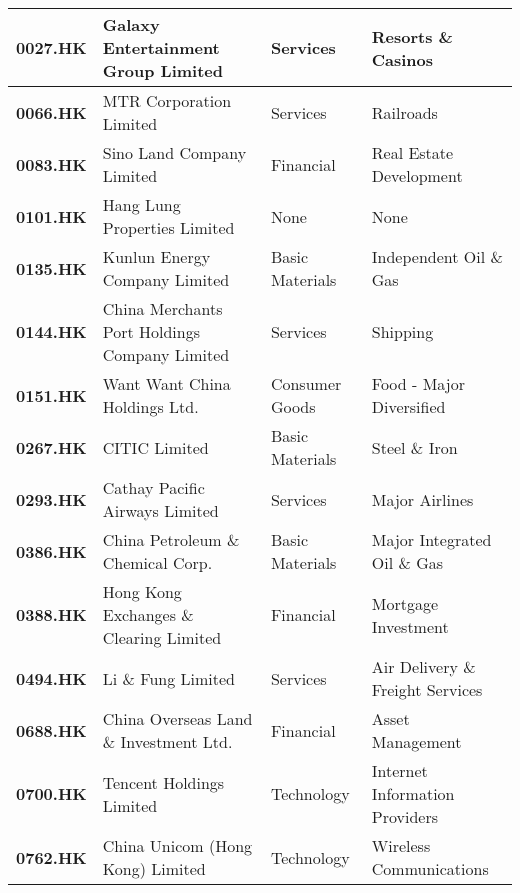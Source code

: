 \begin{table}[h]
{\begin{tabular}{|l|l|l|l|}
			\textbf{0027.HK} & Galaxy Entertainment Group Limited               & Services         & Resorts \& Casinos                        \\ \hline
			\textbf{0066.HK} & MTR Corporation Limited                          & Services         & Railroads                                 \\ \hline
			\textbf{0083.HK} & Sino Land Company Limited                        & Financial        & Real Estate Development                   \\ \hline
			\textbf{0101.HK} & Hang Lung Properties Limited                     & None             & None                                      \\ \hline
			\textbf{0135.HK} & Kunlun Energy Company Limited                    & Basic Materials  & Independent Oil \& Gas                    \\ \hline
			\textbf{0144.HK} & China Merchants Port Holdings Company Limited    & Services         & Shipping                                  \\ \hline
			\textbf{0151.HK} & Want Want China Holdings Ltd.                    & Consumer Goods   & Food - Major Diversified                  \\ \hline
			\textbf{0267.HK} & CITIC Limited                                    & Basic Materials  & Steel \& Iron                             \\ \hline
			\textbf{0293.HK} & Cathay Pacific Airways Limited                   & Services         & Major Airlines                            \\ \hline
			\textbf{0386.HK} & China Petroleum \& Chemical Corp.                & Basic Materials  & Major Integrated Oil \& Gas               \\ \hline
			\textbf{0388.HK} & Hong Kong Exchanges \& Clearing Limited          & Financial        & Mortgage Investment                       \\ \hline
			\textbf{0494.HK} & Li \& Fung Limited                               & Services         & Air Delivery \& Freight Services          \\ \hline
			\textbf{0688.HK} & China Overseas Land \& Investment Ltd.           & Financial        & Asset Management                          \\ \hline
			\textbf{0700.HK} & Tencent Holdings Limited                         & Technology       & Internet Information Providers            \\ \hline
			\textbf{0762.HK} & China Unicom (Hong Kong) Limited                 & Technology       & Wireless Communications                   \\ \hline

\end{tabular}}
\end{table}
